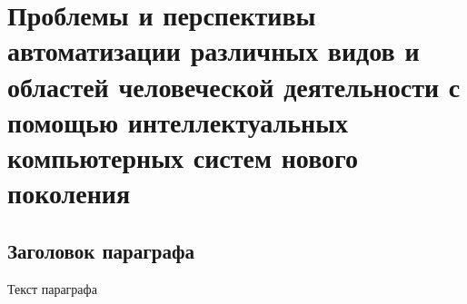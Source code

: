 \chapter{Проблемы и перспективы автоматизации различных видов и областей человеческой деятельности с помощью интеллектуальных компьютерных систем нового поколения}
\label{chapter_automation_perspectives}


\section{Заголовок параграфа}
Текст параграфа

%